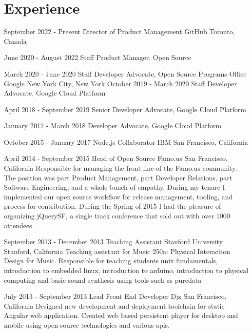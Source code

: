 \documentclass[10pt,a4paper,sans]{moderncv}   %
\begin{document}
\makecvtitle

\section{Experience}

\cventry
  {September 2022 - Present}
  {Director of Product Management}
  {GitHub}
  {Toronto, Canada}{}
  {}

\cventry
  {June 2020 - August 2022}
  {Staff Product Manager, Open Source}
  {}
  {}{}
  {}

\cventry
  {March 2020 - June 2020}
  {Staff Developer Advocate, Open Source Programs Office}
  {Google}
  {New York City, New York}{}
  {}
\cventry
  {October 2019 - March 2020}
  {Staff Developer Advocate, Google Cloud Platform}
  {}
  {}{}
  {}

\cventry
  {April 2018 - September 2019}
  {Senior Developer Advocate, Google Cloud Platform}
  {}
  {}{}
  {}

\cventry
  {January 2017 - March 2018}
  {Developer Advocate, Google Cloud Platform}
  {}
  {}{}
  {}

  \cventry
  {October 2015 - January 2017}
  {Node.js Collaborator}
  {IBM}
  {San Francisco, California}{}
  {}

\cventry
  {April 2014 - September 2015}
  {Head of Open Source}
  {Famo.us}
  {San Francisco, California}{}
  {Responsible for managing the front line of the Famo.us community. The position was part Product Management, part Developer Relations, part Software Engineering, and a whole bunch of empathy.  During my tenure I implemented our open source workflow for release management, tooling, and process for contribution. During the Spring of 2015 I had the pleasure of organizing jQuerySF, a single track conference that sold out with over 1000 attendees.}

\cventry
  {September 2013 - December 2013}
  {Teaching Assistant}
  {Stanford University}
  {Stanford, California}{}
  {Teaching assistant for Music 250a: Physical Interaction Design for Music.  Responsible for teaching students unix fundamentals, introduction to embedded linux, introduction to arduino, introduction to physical computing and basic sound synthesis using tools such as puredata}

\cventry
  {July 2013 - September 2013}
  {Lead Front End Developer}
  {Djz}
  {San Francisco, California}{}
  {Designed new development and deployment toolchain for static Angular web application.  Created web based persistent player for desktop and mobile using open source technologies and various apis.}
\end{document}
